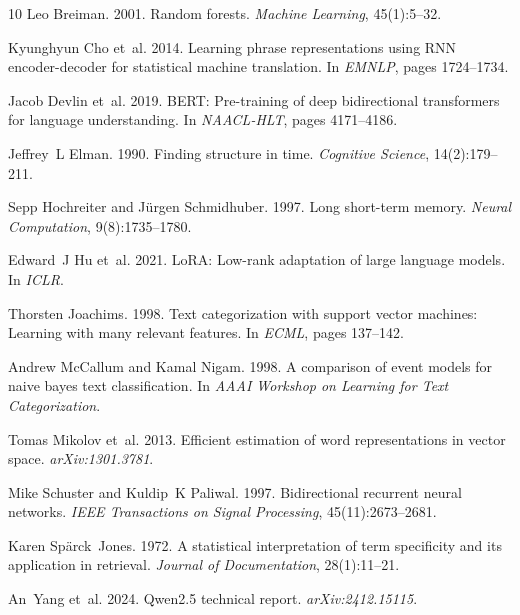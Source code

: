 \documentclass[11pt,a4paper,twocolumn]{article}
\begin{document}
\begin{thebibliography}{10}
Leo Breiman. 2001. Random forests. \textit{Machine Learning}, 45(1):5--32.

Kyunghyun Cho et~al. 2014. Learning phrase representations using RNN encoder-decoder for statistical machine translation. In \textit{EMNLP}, pages 1724--1734.

Jacob Devlin et~al. 2019. BERT: Pre-training of deep bidirectional transformers for language understanding. In \textit{NAACL-HLT}, pages 4171--4186.

Jeffrey~L Elman. 1990. Finding structure in time. \textit{Cognitive Science}, 14(2):179--211.

Sepp Hochreiter and J{\"u}rgen Schmidhuber. 1997. Long short-term memory. \textit{Neural Computation}, 9(8):1735--1780.

Edward~J Hu et~al. 2021. LoRA: Low-rank adaptation of large language models. In \textit{ICLR}.

Thorsten Joachims. 1998. Text categorization with support vector machines: Learning with many relevant features. In \textit{ECML}, pages 137--142.

Andrew McCallum and Kamal Nigam. 1998. A comparison of event models for naive bayes text classification. In \textit{AAAI Workshop on Learning for Text Categorization}.

Tomas Mikolov et~al. 2013. Efficient estimation of word representations in vector space. \textit{arXiv:1301.3781}.

Mike Schuster and Kuldip~K Paliwal. 1997. Bidirectional recurrent neural networks. \textit{IEEE Transactions on Signal Processing}, 45(11):2673--2681.

Karen Sp{\"a}rck~Jones. 1972. A statistical interpretation of term specificity and its application in retrieval. \textit{Journal of Documentation}, 28(1):11--21.

An~Yang et~al. 2024. Qwen2.5 technical report. \textit{arXiv:2412.15115}.
\end{thebibliography}
\end{document}
